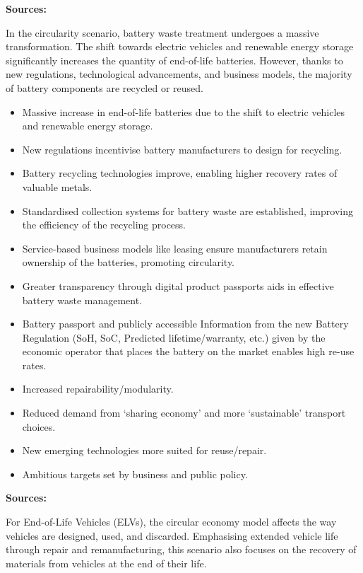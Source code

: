 \wasteSubsubsecBATT 
\textbf{Sources:}~\cite{helander2023battelv, eu2020batt, halleux2021batt, eu2023batt}


In the circularity scenario, battery waste treatment undergoes a massive transformation. The shift towards electric vehicles and renewable energy storage significantly increases the quantity of end-of-life batteries. However, thanks to new regulations, technological advancements, and business models, the majority of battery components are recycled or reused.

\begin{itemize}
  \item Massive increase in end-of-life batteries due to the shift to electric vehicles and renewable energy storage.
  \item New regulations incentivise battery manufacturers to design for recycling.
  \item Battery recycling technologies improve, enabling higher recovery rates of valuable metals.
  \item Standardised collection systems for battery waste are established, improving the efficiency of the recycling process.
  \item Service-based business models like leasing ensure manufacturers retain ownership of the batteries, promoting circularity.
  \item Greater transparency through digital product passports aids in effective battery waste management.
  \item Battery passport and publicly accessible Information from the new Battery Regulation (SoH, SoC, Predicted lifetime/warranty, etc.) given by the economic operator that places the battery on the market enables high re-use rates.
  \item Increased repairability/modularity.
  \item Reduced demand from `sharing economy’ and more `sustainable’ transport choices.
  \item New emerging technologies more suited for reuse/repair.
  \item Ambitious targets set by business and public policy.
\end{itemize}



\wasteSubsubsecELV 
\textbf{Sources:}~\cite{eu2023elv,lovik2021elv, tazi2023elv, helander2023battelv, ljunggren2022elv,iea2023evoutlook}


For End-of-Life Vehicles (ELVs), the circular economy model affects the way vehicles are designed, used, and discarded. Emphasising extended vehicle life through repair and remanufacturing, this scenario also focuses on the recovery of materials from vehicles at the end of their life.


